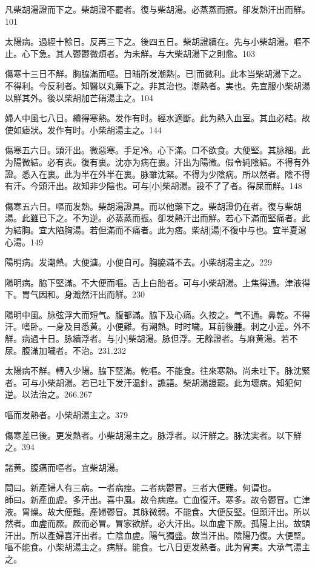 \documentclass[12pt,twoside,UTF8,b5paper]{ctexbook}
\begin{document}
凡柴胡湯證而下之。柴胡證不罷者。復与柴胡湯。必蒸蒸而振。卻发熱汗出而觧。101

太陽病。過經十餘日。反再三下之。後四五日。柴胡證續在。先与小柴胡湯。嘔不止。心下急。其人鬱鬱微煩者。为未觧。与大柴胡湯下之則愈。103

傷寒十三日不觧。胸脇滿而嘔。日晡所发潮熱[。已]而微利。此本当柴胡湯下之。不得利。今反利者。知醫以丸藥下之。非其治也。潮熱者。実也。先宜服小柴胡湯以觧其外。後以柴胡加芒硝湯主之。104

婦人中風七八日。續得寒熱。发作有时。經水適斷。此为熱入血室。其血必結。故使如瘧狀。发作有时。小柴胡湯主之。144

傷寒五六日。頭汗出。微惡寒。手足冷。心下滿。口不欲食。大便堅。其脉細。此为陽微結。必有表。復有裏。沈亦为病在裏。汗出为陽微。假令純陰結。不得有外證。悉入在裏。此为半在外半在裏。脉雖沈緊。不得为少陰病。所以然者。陰不得有汗。今頭汗出。故知非少陰也。可与[小]柴胡湯。設不了了者。得屎而觧。148

傷寒五六日。嘔而发熱。柴胡湯證具。而以他藥下之。柴胡證仍在者。復与柴胡湯。此雖已下之。不为逆。必蒸蒸而振。卻发熱汗出而觧。若心下滿而堅痛者。此为結胸。宜大陷胸湯。若但滿而不痛者。此为痞。柴胡[湯]不復中与也。宜半夏瀉心湯。149

陽明病。发潮熱。大便溏。小便自可。胸脇滿不去。小柴胡湯主之。229

陽明病。脇下堅滿。不大便而嘔。舌上白胎者。可与小柴胡湯。上焦得通。津液得下。胃气因和。身濈然汗出而觧。230

陽明中風。脉弦浮大而短气。腹都滿。脇下及心痛。久按之。气不通。鼻乾。不得汗。嗜卧。一身及目悉黄。小便難。有潮熱。时时噦。耳前後腫。刺之小差。外不觧。病過十日。脉續浮者。与[小]柴胡湯。脉但浮。无餘證者。与麻黄湯。若不尿。腹滿加噦者。不治。231.232

太陽病不觧。轉入少陽。脇下堅滿。乾嘔。不能食。往來寒熱。尚未吐下。脉沈緊者。可与小柴胡湯。若已吐下发汗温針。譫語。柴胡湯證罷。此为壞病。知犯何逆。以法治之。266.267

嘔而发熱者。小柴胡湯主之。379

傷寒差已後。更发熱者。小柴胡湯主之。脉浮者。以汗觧之。脉沈実者。以下觧之。394

諸黄。腹痛而嘔者。宜柴胡湯。

問曰。新產婦人有三病。一者病痙。二者病鬱冒。三者大便難。何谓也。\\
師曰。新產血虗。多汗出。喜中風。故令病痙。亡血復汗。寒多。故令鬱冒。亡津液。胃燥。故大便難。產婦鬱冒。其脉微弱。不能食。大便反堅。但頭汗出。所以然者。血虗而厥。厥而必冒。冒家欲觧。必大汗出。以血虗下厥。孤陽上出。故頭汗出。所以產婦喜汗出者。亡陰血虗。陽气獨盛。故当汗出。陰陽乃復。大便堅。嘔不能食。小柴胡湯主之。病觧。能食。七八日更发熱者。此为胃実。大承气湯主之。
\end{document}
